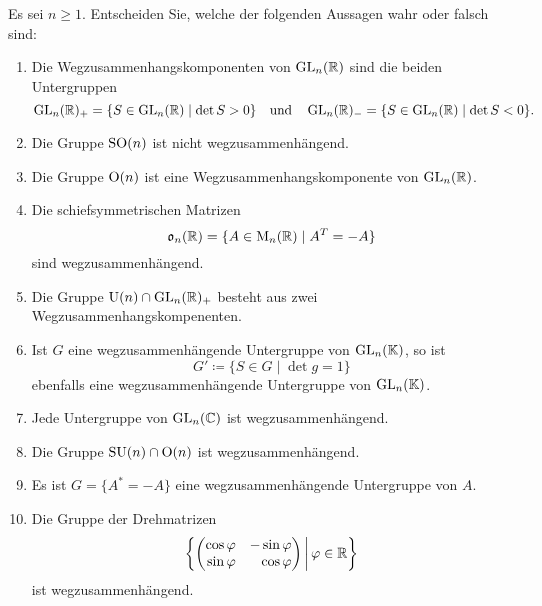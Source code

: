 \documentclass[a4paper,10pt]{scrartcl}
\begin{document}
\begin{question}
  Es sei $n \geq 1$.
  Entscheiden Sie, welche der folgenden Aussagen wahr oder falsch sind:
  \begin{enumerate}[leftmargin=*]
    \item
      Die Wegzusammenhangskomponenten von $\operatorname{GL}_n(\mathbb{R})$ sind die beiden Untergruppen
      \[
        \operatorname{GL}_n(\mathbb{R})_+ = \{ S \in \operatorname{GL}_n(\mathbb{R}) \mid \det S > 0 \}
        \quad\text{und}\quad
        \operatorname{GL}_n(\mathbb{R})_- = \{ S \in \operatorname{GL}_n(\mathbb{R}) \mid \det S < 0 \}.
      \]
    \item
      Die Gruppe $\operatorname{SO}(n)$ ist nicht wegzusammenhängend.
    \item
      Die Gruppe $\operatorname{O}(n)$ ist eine Wegzusammenhangskomponente von $\operatorname{GL}_n(\mathbb{R})$.
    \item
      Die schiefsymmetrischen Matrizen
      \[
        \mathfrak{o}_n(\mathbb{R}) = \{ A \in \operatorname{M}_n(\mathbb{R}) \mid A^T = -A \}
      \]
      sind wegzusammenhängend.
    \item
      Die Gruppe $\operatorname{U}(n) \cap \operatorname{GL}_n(\mathbb{R})_+$ besteht aus zwei Wegzusammenhangskompenenten.
    \item
      Ist $G$ eine wegzusammenhängende Untergruppe von $\operatorname{GL}_n(\mathbb{K})$, so ist
      \[
        G' \coloneqq \{ S \in G \mid \det g = 1 \}
      \]
      ebenfalls eine wegzusammenhängende Untergruppe von $\operatorname{GL}_n(\mathbb{K})$.
    \item
      Jede Untergruppe von $\operatorname{GL}_n(\mathbb{C})$ ist wegzusammenhängend.
    \item
      Die Gruppe $\operatorname{SU}(n) \cap \operatorname{O}(n)$ ist wegzusammenhängend.
    \item
      Es ist $G = \{A^* = - A\}$ eine wegzusammenhängende Untergruppe von $A$.
    \item
      Die Gruppe der Drehmatrizen
      \[
        \left\{
          \begin{pmatrix*}[r]
            \cos \varphi  & -\sin \varphi \\
            \sin \varphi  &  \cos \varphi 
          \end{pmatrix*}
        \,\middle|\,
        \varphi \in \Rbb
        \right\}
      \]
      ist wegzusammenhängend.
  \end{enumerate}
\end{question}
\end{document}
